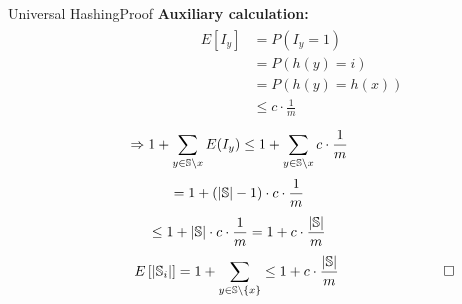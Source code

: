 
\begin{frame}{Universal Hashing}{Proof}
  \textbf{Auxiliary calculation:}
         {\color{Mittel-Blau}
           \vspace*{-2em}
           \begin{align*}
             \hspace{6em}           
             \begin{array}{rl}
               E[I_y] & = P(I_y = 1)\\
               {} & = P(h(y) = i)\\
               {} & = P(h(y) = h(x))\\
               {} & \leq c \cdot \frac{1}{m}
             \end{array}
         \end{align*}}
         {\color{Mittel-Blau}
           \vspace{-0.6em}
           \begin{displaymath}
             \hspace*{-3em}
             \Rightarrow 1 + \sum_{y \in \mathbb{S} \setminus x} E(I_y)
             \leq 1 + \sum_{y \in \mathbb{S} \setminus x} c \cdot \frac{1}{m}
           \end{displaymath}
           \vspace{-0.6em}
           \begin{displaymath}
             \hspace*{-3em}
             = 1 + \left(\vert \mathbb{S}  \vert - 1\right) \cdot c \cdot \frac{1}{m}
           \end{displaymath}
           \vspace{-0.6em}
           \begin{displaymath}
             \hspace*{-3em}
             \displaystyle \leq 1 + \vert \mathbb{S} \vert \cdot c \cdot \frac{1}{m}
             = 1 + c \cdot \frac{\vert \mathbb{S} \vert}{m}
           \end{displaymath}
           \vspace{-0.6em}
           \begin{displaymath}
             \hspace*{5em}
             E\left[\vert \mathbb{S}_i \vert\right]
             = 1 + \sum_{y \in \mathbb{S} \setminus \{x\}}
             \leq 1 + c \cdot \frac{\vert \mathbb{S} \vert}{m}
             \hspace*{7.5em}\square
         \end{displaymath}}
\end{frame}
